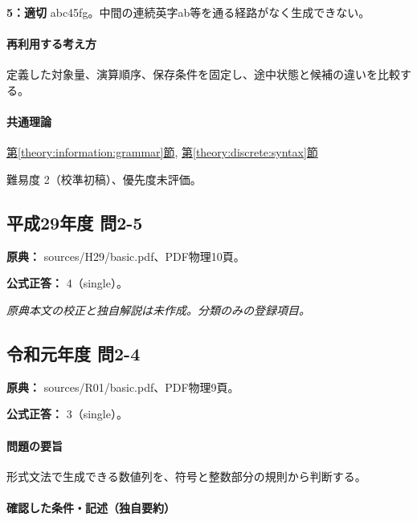 \noindent\textbf{5：適切} abc45fg。中間の連続英字ab等を通る経路がなく生成できない。\par

\paragraph{再利用する考え方} 定義した対象量、演算順序、保存条件を固定し、途中状態と候補の違いを比較する。

\paragraph{共通理論} \hyperref[theory:information:grammar]{第\ref*{theory:information:grammar}節}, \hyperref[theory:discrete:syntax]{第\ref*{theory:discrete:syntax}節}

\par 難易度 2（校準初稿）、優先度未評価。

\subsection{平成29年度 問2-5}
\label{q:h29-reg-basic-2-5}

\noindent\textbf{原典：} sources/H29/basic.pdf、PDF物理10頁。

\textbf{公式正答：} 4（single）。

\par\textit{原典本文の校正と独自解説は未作成。分類のみの登録項目。}

\subsection{令和元年度 問2-4}
\label{q:r01-reg-basic-2-4}

\noindent\textbf{原典：} sources/R01/basic.pdf、PDF物理9頁。

\textbf{公式正答：} 3（single）。

\paragraph{問題の要旨} 形式文法で生成できる数値列を、符号と整数部分の規則から判断する。

\paragraph{確認した条件・記述（独自要約）}\mbox{}\par

